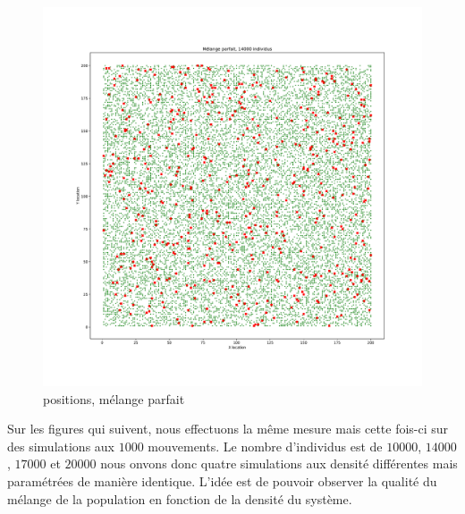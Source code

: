 \begin{figure}[h]
	\centering
	\captionsetup{justification=centering}
	\includegraphics[width=.7\textwidth]{Images/SI_positions_14k_mix.pdf}
	\caption{positions, mélange parfait}
\end{figure}

\newpage

Sur les figures qui suivent, nous effectuons la même mesure mais cette fois-ci sur des simulations aux $1000$ mouvements. Le nombre d'individus est de $10000$, $14000$, $17000$ et $20000$ nous onvons donc quatre simulations aux densité différentes mais paramétrées de manière identique. L'idée est de pouvoir observer la qualité du mélange de la population en fonction de la densité du système.

